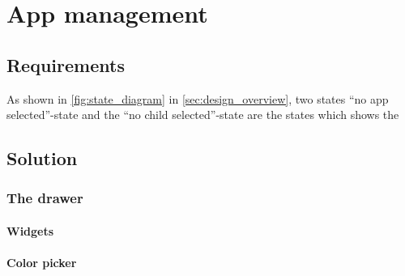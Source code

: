 \section{App management}
\label{sec:app_management}

\subsection{Requirements}
\label{sec:appman_requirements}

As shown in \autoref{fig:state_diagram} in \autoref{sec:design_overview}, two states ``no app selected''-state and the ``no child selected''-state are the states which shows the 

\subsection{Solution}
\label{sec:appman_solution}

\subsubsection{The drawer}
\label{sec:drawer}
\paragraph{Widgets}
\label{par:widgets}
\paragraph{Color picker}